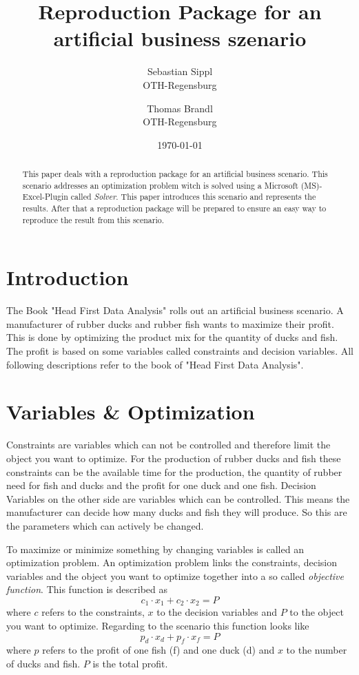 \documentclass{article}
\title{\textbf{Reproduction Package for an artificial business szenario}}
\author{Sebastian Sippl  \\
	OTH-Regensburg  \\
	\and 
	Thomas Brandl \\
	OTH-Regensburg  \\
	}
\date{\today}
\begin{document}
\maketitle
\begin{abstract}
This paper deals with a reproduction package for an artificial business scenario. This scenario addresses an optimization problem witch is solved using a Microsoft (MS)-Excel-Plugin called \textit{Solver}. This paper introduces this scenario and represents the results. After that a reproduction package will be prepared to ensure an easy way to reproduce the result from this scenario.
\end{abstract}

\begin{multicols}{2}

\section{Introduction}
The Book "Head First Data Analysis" \cite{micheal} rolls out an artificial business scenario. A manufacturer of rubber ducks and rubber fish wants to maximize their profit. This is done by optimizing the product mix for the quantity of ducks and fish. The profit is based on some variables called constraints and decision variables. All following descriptions refer to the book of "Head First Data Analysis".

\section{Variables \& Optimization}
Constraints are variables which can not be controlled and therefore limit the object you want to optimize. For the production of rubber ducks and fish these constraints can be the available time for the production, the quantity of rubber need for fish and ducks and the profit for one duck and one fish. Decision Variables on the other side are variables which can be controlled. This means the manufacturer can decide how many ducks and fish they will produce. So this are the parameters which can actively be changed. 

To maximize or minimize something by changing variables is called an optimization problem. An optimization problem links the constraints, decision variables and the object you want to optimize together into a so called \textit{objective function}. This function is described as 
\begin{equation}
c_{1}\cdot x_{1} + c_{2}\cdot x_{2} = P
\end{equation}
where $c$ refers to the constraints, $x$ to the decision variables and $P$ to the object you want to optimize. Regarding to the scenario this function looks like 
\begin{equation}
p_{d}\cdot x_{d} + p_{f}\cdot x_{f} = P
\end{equation}
where $p$ refers to the profit of one fish (f) and one duck (d) and $x$ to the number of ducks and fish. $P$ is the total profit.


\end{multicols}
\end{document}
